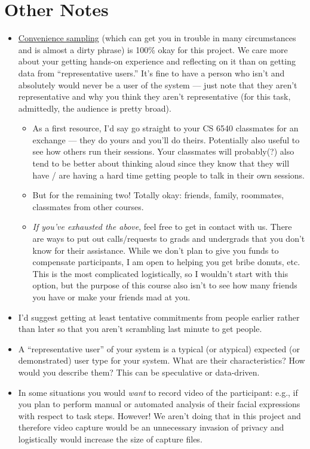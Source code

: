 \documentclass{article}
\begin{document}
\section{Other Notes}
\begin{itemize}
    \item \href{https://en.wikipedia.org/wiki/Convenience_sampling}{Convenience sampling} (which can get you in trouble in many circumstances and is almost a dirty phrase) is 100\% okay for this project. We care more about your getting hands-on experience and reflecting on it than on getting data from ``representative users.'' It's fine to have a person who isn't and absolutely would never be a user of the system --- just note that they aren't representative and why you think they aren't representative (for this task, admittedly, the audience is pretty broad).

    \begin{itemize}
        \item As a first resource, I'd say go straight to your CS 6540 classmates for an exchange --- they do yours and you'll do theirs. Potentially also useful to see how others run their sessions. Your classmates will probably(?) also tend to be better about thinking aloud since they know that they will have / are having a hard time getting people to talk in their own sessions.
    
        \item But for the remaining two! Totally okay: friends, family, roommates, classmates from other courses.
        
        \item \textit{If you've exhausted the above}, feel free to get in contact with us. There are ways to put out calls/requests to grads and undergrads that you don't know for their assistance. While we don't plan to give you funds to compensate participants, I am open to helping you get bribe donuts, etc. This is the most complicated logistically, so I wouldn't start with this option, but the purpose of this course also isn't to see how many friends you have or make your friends mad at you.
        
    \end{itemize}
\item I'd suggest getting at least tentative commitments from people earlier rather than later so that you aren't scrambling last minute to get people.

\item A ``representative user'' of your system is a typical (or atypical) expected (or demonstrated) user type for your system. What are their characteristics? How would you describe them? This can be speculative or data-driven.

\item In some situations you would \textit{want} to record video of the participant: e.g., if you plan to perform manual or automated analysis of their facial expressions with respect to task steps. However! We aren't doing that in this project and therefore video capture would be an unnecessary invasion of privacy and logistically would increase the size of capture files.
\end{itemize}
\end{document}
